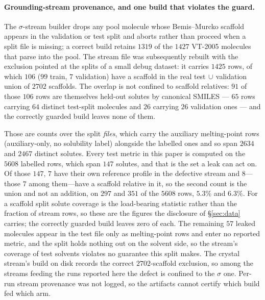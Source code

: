 \paragraph{Grounding-stream provenance, and one build that violates the guard.} The
$\sigma$-stream builder drops any pool molecule whose Bemis--Murcko scaffold appears in the
validation or test split and aborts rather than proceed when a split file is missing; a correct
build retains $1319$ of the $1427$ VT-2005 molecules that parse into the pool. The stream file was
subsequently rebuilt with the exclusion pointed at the splits of a small debug dataset: it carries
$1425$ rows, of which $106$ ($99$ train, $7$ validation) have a scaffold in the real
test$\,\cup\,$validation union of $2702$ scaffolds. The overlap is not confined to scaffold
relatives: $91$ of those $106$ rows are themselves held-out solutes by canonical SMILES --- $65$
rows carrying $64$ distinct test-split molecules and $26$ carrying $26$ validation ones --- and the
correctly guarded build leaves none of them.

Those are counts over the split \emph{files}, which carry the auxiliary melting-point rows
(auxiliary-only, no solubility label) alongside the labelled ones and so span $2634$ and
$2467$ distinct solutes. Every test metric in this paper is computed on the $5608$ labelled rows,
which span $147$ solutes, and that is the set a leak can act on. Of those $147$, $7$ have their own
reference profile in the defective stream and $8$---those $7$ among them---have a scaffold relative
in it, so the second count is the union and not an addition, on $297$ and
$351$ of the $5608$ rows, $5.3\%$ and $6.3\%$. For a scaffold split solute
coverage is the load-bearing statistic rather than the fraction of stream rows, so these are the
figures the disclosure of \S\ref{sec:data} carries; the correctly guarded build leaves zero of each.
The remaining $57$ leaked molecules appear in the test file only as melting-point rows and enter no
reported metric, and the split holds nothing out on the solvent side, so the stream's coverage of
test solvents violates no guarantee this split makes.
The crystal stream's build on disk
records the correct $2702$-scaffold exclusion, so among the streams feeding the runs reported here
the defect is confined to the $\sigma$ one. Per-run stream provenance was not logged, so the
artifacts cannot certify which build fed which arm.

